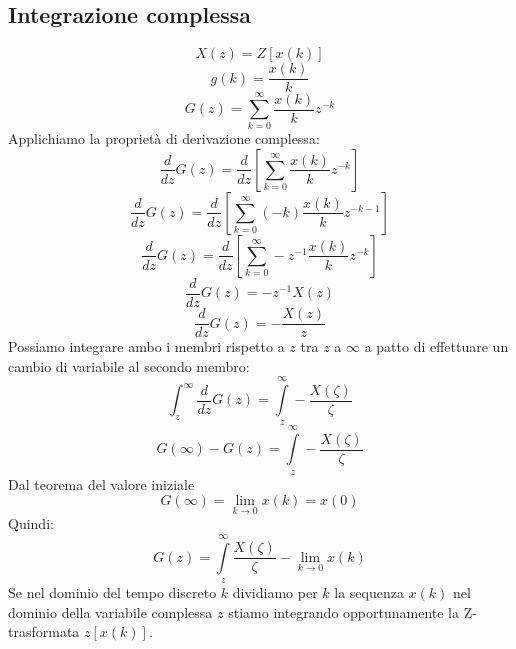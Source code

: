 \documentclass[a4paper]{report}
\begin{document}
\subsection{Integrazione complessa}
\[
X(z) = Z[x(k)]
\]
\[
g(k) = \dfrac{x(k)}{k}
\]
\[
G(z) = \sum_{k = 0}^{\infty} \dfrac{x(k)}{k}z^{-k}
\]
Applichiamo la propriet\`a di derivazione complessa:
\[
\dfrac{d}{dz}G(z) = \dfrac{d}{dz}\left[\sum_{k = 0}^{\infty}
  \dfrac{x(k)}{k}z^{-k}\right] 
\]
\[
\dfrac{d}{dz}G(z) = \dfrac{d}{dz}\left[\sum_{k = 0}^{\infty}
  (-k)\dfrac{x(k)}{k}z^{-k-1}\right] 
\]
\[
\dfrac{d}{dz}G(z) = \dfrac{d}{dz}\left[\sum_{k = 0}^{\infty}
  -z^{-1}\dfrac{x(k)}{k}z^{-k}\right] 
\]
\[
\dfrac{d}{dz}G(z) = -z^{-1}X(z)
\]
\[
\dfrac{d}{dz}G(z) = -\dfrac{X(z)}{z}
\]
Possiamo integrare ambo i membri rispetto a $z$ tra $z$ a $\infty$ a
patto di effettuare un cambio di variabile al secondo membro:
\[
\int_{z}^{\infty}\dfrac{d}{dz}G(z) = \int\limits_{z}^{\infty}
-\dfrac{X(\zeta)}{\zeta}
\]
\[
G(\infty) - G(z) = \int\limits_{z}^{\infty}
-\dfrac{X(\zeta)}{\zeta}
\]
Dal teorema del valore iniziale
\[
G(\infty) = \lim\limits_{k \to 0} x(k) = x(0)
\]
Quindi:
\[
G(z) = \int\limits_{z}^{\infty} \dfrac{X(\zeta)}{\zeta} - \lim_{k \to
  0} x(k)
\]
Se nel dominio del tempo discreto $k$ dividiamo per $k$ la sequenza
$x(k)$ nel dominio della variabile complessa $z$ stiamo
integrando opportunamente la Z-trasformata $z[x(k)]$.
\end{document}
